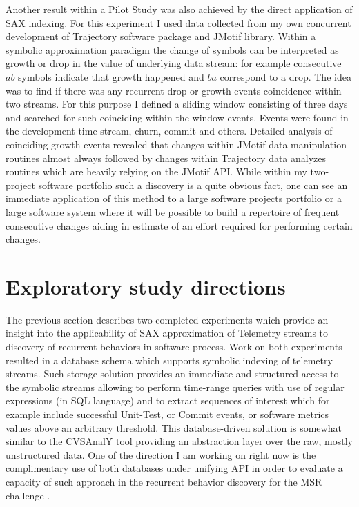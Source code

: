 \documentclass{sig-alternate}
\begin{document}
Another result within a Pilot Study was also achieved by the direct application of SAX indexing. For this experiment I used data collected from my own concurrent development of Trajectory software package and JMotif library. Within a symbolic approximation paradigm the change of symbols can be interpreted as growth or drop in the value of underlying data stream: for example consecutive $ab$ symbols indicate that growth happened and $ba$ correspond to a drop. The idea was to find if there was any recurrent drop or growth events coincidence within two streams. For this purpose I defined a sliding window consisting of three days and searched for such coinciding within the window events. Events were found in the development time stream, churn, commit and others. Detailed analysis of coinciding growth events revealed that changes within JMotif data manipulation routines almost always followed by changes within Trajectory data analyzes routines which are heavily relying on the JMotif API. While within my two-project software portfolio such a discovery is a quite obvious fact, one can see an immediate application of this method to a large software projects portfolio or a large software system where it will be possible to build a repertoire of frequent consecutive changes aiding in estimate of an effort required for performing certain changes.

\section{Exploratory study directions}
The previous section describes two completed experiments which provide an insight into the applicability of SAX approximation of Telemetry streams to discovery of recurrent behaviors in software process. Work on both experiments resulted in a database schema which supports symbolic indexing of telemetry streams. Such storage solution provides an immediate and structured access to the symbolic streams allowing to perform time-range queries with use of regular expressions (in SQL language) and to extract sequences of interest which for example include successful Unit-Test, or Commit events, or software metrics values above an arbitrary threshold. This database-driven solution is somewhat similar to the CVSAnalY tool \cite{citeulike:6544724} providing an abstraction layer over the raw, mostly unstructured data. One of the direction I am working on right now is the complimentary use of both databases under unifying API in order to evaluate a capacity of such approach in the recurrent behavior discovery for the MSR challenge \cite{citeulike:5043676}.
\end{document}
